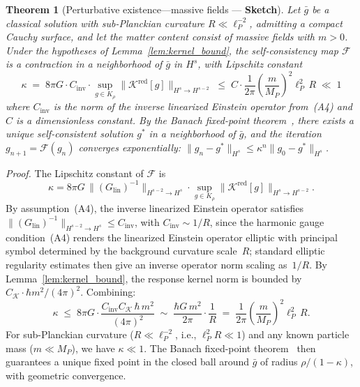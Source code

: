 \documentclass[12pt,a4paper]{article}
\newtheorem{theorem}{Theorem}
\begin{document}
\begin{theorem}[Perturbative existence---massive fields --- \textbf{Sketch}]
\label{thm:banach}
Let $\bar{g}$ be a classical solution with sub-Planckian curvature
$R \ll \ell_P^{-2}$, \emph{admitting a compact Cauchy surface}, and let the matter
content consist of massive fields with
$m > 0$. Under the hypotheses of Lemma~\ref{lem:kernel_bound}, the self-consistency
map $\mathcal{F}$ is a contraction in a neighborhood of $\bar{g}$ in $H^s$, with
Lipschitz constant
\begin{equation}
\kappa \;=\; 8\pi G \cdot C_{\mathrm{inv}} \cdot
\sup_{g \in K_\rho}\bigl\|\mathcal{K}^{\mathrm{red}}[g]\bigr\|_{H^s \to H^{s-2}}
\;\leq\; C \cdot \frac{1}{2\pi}\!\left(\frac{m}{M_P}\right)^{\!2}\ell_P^2\, R
\;\ll\; 1
\label{eq:kappa}
\end{equation}
where $C_{\mathrm{inv}}$ is the norm of the inverse linearized Einstein operator
from~\emph{(A4)} and $C$ is a dimensionless constant. By the Banach fixed-point
theorem~\cite{banach}, there exists a unique self-consistent solution $g^*$ in a neighborhood of
$\bar{g}$, and the iteration $g_{n+1} = \mathcal{F}(g_n)$ converges exponentially:
$\|g_n - g^*\|_{H^s} \leq \kappa^n\|g_0 - g^*\|_{H^s}$.
\end{theorem}

\noindent\emph{Proof.} The Lipschitz constant of $\mathcal{F}$ is
\begin{equation}
\kappa = 8\pi G\,\bigl\|(G_{\mathrm{lin}})^{-1}\bigr\|_{H^{s-2}\to H^s}
\cdot \sup_{g \in K_\rho}
\bigl\|\mathcal{K}^{\mathrm{red}}[g]\bigr\|_{H^s \to H^{s-2}}.
\end{equation}
By assumption~(A4), the inverse linearized Einstein operator satisfies
$\|(G_{\mathrm{lin}})^{-1}\|_{H^{s-2}\to H^s} \leq C_{\mathrm{inv}}$, with
$C_{\mathrm{inv}} \sim 1/R$, since the harmonic gauge condition~(A4) renders the linearized Einstein operator elliptic with principal symbol determined by the background curvature scale~$R$; standard elliptic regularity estimates then give an inverse operator norm scaling as~$1/R$. By Lemma~\ref{lem:kernel_bound}, the response
kernel norm is bounded by $C_{\mathcal{K}} \cdot \hbar m^2/(4\pi)^2$. Combining:
\begin{equation}
\kappa \;\leq\; 8\pi G \cdot \frac{C_{\mathrm{inv}}C_{\mathcal{K}}\,\hbar\, m^2}{(4\pi)^2}
\;\sim\; \frac{\hbar G\, m^2}{2\pi}
\cdot \frac{1}{R}
\;=\; \frac{1}{2\pi}\!\left(\frac{m}{M_P}\right)^{\!2}\ell_P^2\, R.
\end{equation}
For sub-Planckian curvature ($R \ll \ell_P^{-2}$, i.e., $\ell_P^2 R \ll 1$)
and any known particle mass ($m \ll M_P$), we have $\kappa \ll 1$.
The Banach fixed-point theorem~\cite{banach} then guarantees a unique
fixed point in the closed ball around $\bar{g}$ of radius
$\rho/(1-\kappa)$, with geometric convergence.
\end{document}
